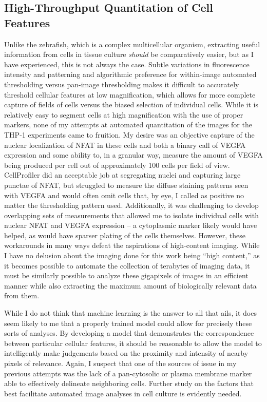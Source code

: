 \subsection{High\hyp{}Throughput Quantitation of Cell Features}\label{measurecells}

Unlike the zebrafish, which is a complex multicellular organism, extracting useful information from cells in tissue culture \textit{should} be comparatively easier, but as I have experienced, this is not always the case. Subtle variations in fluorescence intensity and patterning and algorithmic preference for within\hyp{}image automated thresholding versus pan\hyp{}image thresholding makes it difficult to accurately threshold cellular features at low magnification, which allows for more complete capture of fields of cells versus the biased selection of individual cells. While it is relatively easy to segment cells at high magnification with the use of proper markers, none of my attempts at automated quantitation of the images for the THP\hyp{}1 experiments came to fruition. My desire was an objective capture of the nuclear localization of NFAT in these cells and both a binary call of VEGFA expression and some ability to, in a granular way, measure the amount of VEGFA being produced per cell out of approximately 100 cells per field of view. CellProfiler \citep{Carpenter2006, Kamentsky2011, McQuin2018, Stirling2021} did an acceptable job at segregating nuclei and capturing large punctae of NFAT, but struggled to measure the diffuse staining patterns seen with VEGFA and would often omit cells that, by eye, I called as positive no matter the thresholding pattern used. Additionally, it was challenging to develop overlapping sets of measurements that allowed me to isolate individual cells with nuclear NFAT and VEGFA expression -- a cytoplasmic marker likely would have helped, as would have sparser plating of the cells themselves. However, these workarounds in many ways defeat the aspirations of high\hyp{}content imaging. While I have no delusion about the imaging done for this work being ``high content,'' as it becomes possible to automate the collection of terabytes of imaging data, it must be similarly possible to analyze these gigapixels of images in an efficient manner while also extracting the maximum amount of biologically relevant data from them.

While I do not think that machine learning is the answer to all that ails, it does seem likely to me that a properly trained model could allow for precisely these sorts of analyses. By developing a model that demonstrates the correspondence between particular cellular features, it should be reasonable to allow the model to intelligently make judgements based on the proximity and intensity of nearby pixels of relevance. Again, I suspect that one of the sources of issue in my previous attempts was the lack of a pan\hyp{}cytosolic or plasma membrane marker able to effectively delineate neighboring cells. Further study on the factors that best facilitate automated image analyses in cell culture is evidently needed.

